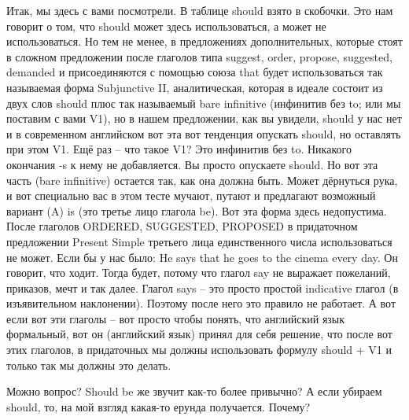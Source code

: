 \documentclass[main.tex]{subfiles}
\begin{document}
Итак, мы здесь с вами посмотрели.
В таблице should взято в скобочки.
Это нам говорит о том, что should может здесь использоваться, а может не использоваться.
Но тем не менее, в предложениях дополнительных, которые стоят в сложном предложении после глаголов типа suggest, order, propose, suggested, demanded и присоединяются с помощью союза that будет использоваться так называемая форма Subjunctive II, аналитическая, которая в идеале состоит из двух слов should плюс так называемый bare infinitive (инфинитив без to; или мы поставим с вами V1), но в нашем предложении, как вы увидели, should у нас нет и в современном английском вот эта вот тенденция опускать should, но оставлять при этом V1.
Ещё раз -- что такое V1?
Это инфинитив без to.
Никакого окончания -s к нему не добавляется.
Вы просто опускаете should.
Но вот эта часть (bare infinitive) остается так, как она должна быть.
Может дёрнуться рука, и вот специально вас в этом тесте мучают, путают и предлагают возможный вариант (A) is (это третье лицо глагола be).
Вот эта форма здесь недопустима.
После глаголов ORDERED, SUGGESTED, PROPOSED в придаточном предложении Present Simple третьего лица единственного числа использоваться не может.
Если бы у нас было: He says that he goes to the cinema every day.
Он говорит, что ходит.
Тогда будет, потому что глагол say не выражает пожеланий, приказов, мечт и так далее.
Глагол says -- это просто простой indicative глагол (в изъявительном наклонении).
Поэтому после него это правило не работает.
А вот если вот эти глаголы -- вот просто чтобы понять, что английский язык формальный, вот он (английский язык) принял для себя решение, что после вот этих глаголов, в придаточных мы должны использовать формулу should + V1 и только так мы должны это делать.

Можно вопрос?
Should be же звучит как-то более привычно?
А если убираем should, то, на мой взгляд какая-то ерунда получается.
Почему?
\end{document}
